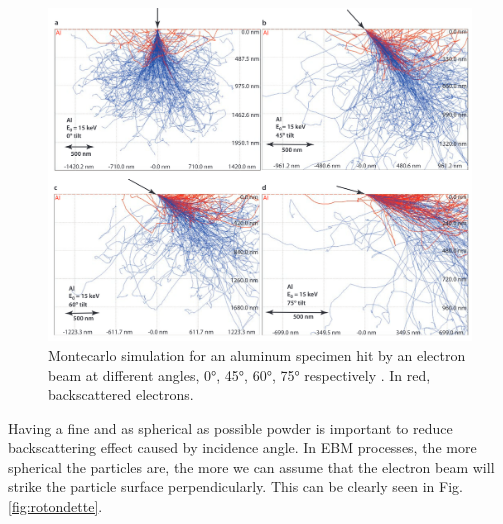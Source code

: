 \begin{figure}
    \centering
    \includegraphics[scale=0.4]{Images/backscattering.png}
    \caption[Backscattering of an electron at different angles.]{Montecarlo simulation for an aluminum specimen hit by an electron beam at different angles, \ang{0}, \ang{45}, \ang{60}, \ang{75} respectively \cite{goldstein_scanning_2018}. In red, backscattered electrons.}
    \label{fig:backscattering}
\end{figure}
Having a fine and as spherical as possible powder is important to reduce backscattering effect caused by incidence angle. In EBM processes, the more spherical the particles are, the more we can assume that the electron beam will strike the particle surface perpendicularly. This can be clearly seen in Fig. \ref{fig:rotondette}.
